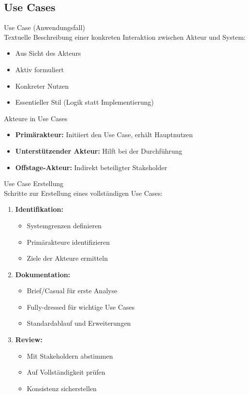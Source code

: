 \columnbreak

\subsection{Use Cases}

\begin{definition}{Use Case (Anwendungsfall)}\\
Textuelle Beschreibung einer konkreten Interaktion zwischen Akteur und System:
\begin{itemize}
    \item Aus Sicht des Akteurs
    \item Aktiv formuliert
    \item Konkreter Nutzen
    \item Essentieller Stil (Logik statt Implementierung)
\end{itemize}
\end{definition}

\begin{theorem}{Akteure in Use Cases}
\begin{itemize}
    \item \textbf{Primärakteur:} Initiiert den Use Case, erhält Hauptnutzen
    \item \textbf{Unterstützender Akteur:} Hilft bei der Durchführung
    \item \textbf{Offstage-Akteur:} Indirekt beteiligter Stakeholder
\end{itemize}
\end{theorem}

\begin{KR}{Use Case Erstellung}\\
Schritte zur Erstellung eines vollständigen Use Cases:
\begin{enumerate}
    \item \textbf{Identifikation:}
    \begin{itemize}
        \item Systemgrenzen definieren
        \item Primärakteure identifizieren
        \item Ziele der Akteure ermitteln
    \end{itemize}
    \item \textbf{Dokumentation:}
    \begin{itemize}
        \item Brief/Casual für erste Analyse
        \item Fully-dressed für wichtige Use Cases
        \item Standardablauf und Erweiterungen
    \end{itemize}
    \item \textbf{Review:}
    \begin{itemize}
        \item Mit Stakeholdern abstimmen
        \item Auf Vollständigkeit prüfen
        \item Konsistenz sicherstellen
    \end{itemize}
\end{enumerate}
\end{KR}

